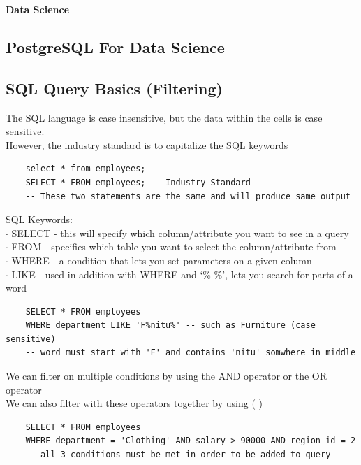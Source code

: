 \documentclass[11pt, a4paper]{article}
\begin{document}
	\begin{titlepage}
		\begin{center} \Huge \textbf{Data Science} \end{center}
		\tableofcontents
		\newpage
	\end{titlepage}
	\begin{spacing}{1.1}
	\section{PostgreSQL For Data Science}
	\lstset{style=SQLstyle}
	\subsection{SQL Query Basics (Filtering)}
	The SQL language is case insensitive, but the data within the cells is case sensitive. \\
	However, the industry standard is to capitalize the SQL keywords
	\begin{lstlisting}
	select * from employees;
	SELECT * FROM employees; -- Industry Standard
	-- These two statements are the same and will produce same output \end{lstlisting} \vspace*{1mm}
	SQL Keywords: \\
	\hspace*{3mm} $\cdot$ SELECT - this will specify which column/attribute you want to see in a query \\
	\hspace*{3mm} $\cdot$ FROM - specifies which table you want to select the column/attribute from \\
	\hspace*{3mm} $\cdot$ WHERE - a condition that lets you set parameters on a given column \\
	\hspace*{3mm} $\cdot$ LIKE - used in addition with WHERE and `\% \%', lets you search for parts of a word
	\begin{lstlisting}
	SELECT * FROM employees
	WHERE department LIKE 'F%nitu%' -- such as Furniture (case sensitive)
	-- word must start with 'F' and contains 'nitu' somwhere in middle	\end{lstlisting} \vspace*{1mm}
	We can filter on multiple conditions by using the AND operator or the OR operator \\
	We can also filter with these operators together by using ( ) 
	\begin{lstlisting}
	SELECT * FROM employees
	WHERE department = 'Clothing' AND salary > 90000 AND region_id = 2
	-- all 3 conditions must be met in order to be added to query 
	

\end{lstlisting}
\end{spacing}
\end{document}
